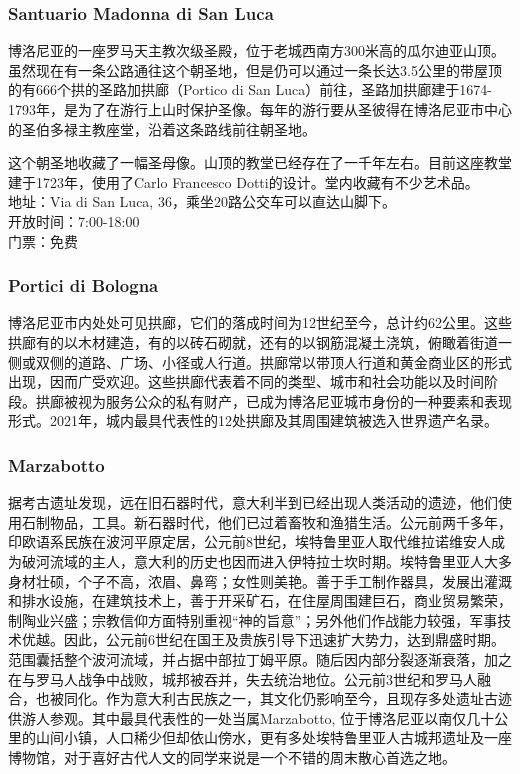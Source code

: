 \subsubsection{Santuario Madonna di San Luca}
博洛尼亚的一座罗马天主教次级圣殿，位于老城西南方300米高的瓜尔迪亚山顶。
虽然现在有一条公路通往这个朝圣地，但是仍可以通过一条长达3.5公里的带屋顶的有666个拱的圣路加拱廊（Portico di San Luca）前往，圣路加拱廊建于1674-1793年，是为了在游行上山时保护圣像。每年的游行要从圣彼得在博洛尼亚市中心的圣伯多禄主教座堂，沿着这条路线前往朝圣地。


这个朝圣地收藏了一幅圣母像。山顶的教堂已经存在了一千年左右。目前这座教堂建于1723年，使用了Carlo Francesco Dotti的设计。堂内收藏有不少艺术品。\\
地址：Via di San Luca, 36，乘坐20路公交车可以直达山脚下。\\
开放时间：7:00-18:00\\
门票：免费

\subsubsection{Portici di Bologna}
博洛尼亚市内处处可见拱廊，它们的落成时间为12世纪至今，总计约62公里。这些拱廊有的以木材建造，有的以砖石砌就，还有的以钢筋混凝土浇筑，俯瞰着街道一侧或双侧的道路、广场、小径或人行道。拱廊常以带顶人行道和黄金商业区的形式出现，因而广受欢迎。这些拱廊代表着不同的类型、城市和社会功能以及时间阶段。拱廊被视为服务公众的私有财产，已成为博洛尼亚城市身份的一种要素和表现形式。2021年，城内最具代表性的12处拱廊及其周围建筑被选入世界遗产名录。

\subsubsection{Marzabotto}
据考古遗址发现，远在旧石器时代，意大利半到已经出现人类活动的遗迹，他们使用石制物品，工具。新石器时代，他们已过着畜牧和渔猎生活。公元前两千多年，印欧语系民族在波河平原定居，公元前8世纪，埃特鲁里亚人取代维拉诺维安人成为破河流域的主人，意大利的历史也因而进入伊特拉士坎时期。埃特鲁里亚人大多身材壮硕，个子不高，浓眉、鼻弯；女性则美艳。善于手工制作器具，发展出灌溉和排水设施，在建筑技术上，善于开采矿石，在住屋周围建巨石，商业贸易繁荣，制陶业兴盛；宗教信仰方面特别重视“神的旨意”；另外他们作战能力较强，军事技术优越。因此，公元前6世纪在国王及贵族引导下迅速扩大势力，达到鼎盛时期。范围囊括整个波河流域，并占据中部拉丁姆平原。随后因内部分裂逐渐衰落，加之在与罗马人战争中战败，城邦被吞并，失去统治地位。公元前3世纪和罗马人融合，也被同化。作为意大利古民族之一，其文化仍影响至今，且现存多处遗址古迹供游人参观。其中最具代表性的一处当属Marzabotto, 位于博洛尼亚以南仅几十公里的山间小镇，人口稀少但却依山傍水，更有多处埃特鲁里亚人古城邦遗址及一座博物馆，对于喜好古代人文的同学来说是一个不错的周末散心首选之地。

